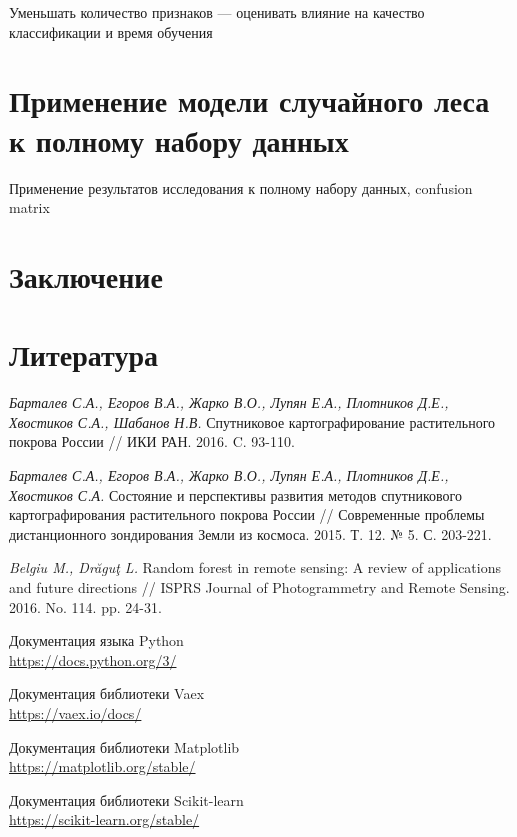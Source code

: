 \documentclass[14pt, a4paper, oneside]{extarticle}
\begin{document}
Уменьшать количество признаков --- оценивать влияние на качество классификации и время обучения
\newpage

\section{Применение модели случайного леса к полному набору данных}
Применение результатов исследования к полному набору данных, confusion matrix
\newpage



\section{Заключение}
\newpage

\section{Литература}
\begingroup
\renewcommand{\section}[2]{}
\begin{thebibliography}{20}
    \textit{Барталев С.А., Егоров В.А., Жарко В.О., Лупян Е.А., Плотников Д.Е., Хвостиков С.А., Шабанов Н.В.} Спутниковое картографирование растительного покрова России // ИКИ РАН. 2016. C. 93-110.

    \textit{Барталев С.А., Егоров В.А., Жарко В.О., Лупян Е.А., Плотников Д.Е., Хвостиков С.А.} Состояние и перспективы развития методов спутникового картографирования растительного покрова России // Современные проблемы дистанционного зондирования Земли из космоса. 2015. Т. 12. № 5. С. 203-221.

    \textit{Belgiu M., Drăguţ L.} Random forest in remote sensing: A review of applications and future
    directions // ISPRS Journal of Photogrammetry and Remote Sensing. 2016. No. 114. pp. 24-31.
    
    Документация языка Python\\
    \url{https://docs.python.org/3/}

    Документация библиотеки Vaex\\
    \url{https://vaex.io/docs/}

    Документация библиотеки Matplotlib\\
    \url{https://matplotlib.org/stable/}

    Документация библиотеки Scikit-learn\\
    \url{https://scikit-learn.org/stable/}
\end{thebibliography}
\endgroup
\newpage
\end{document}
